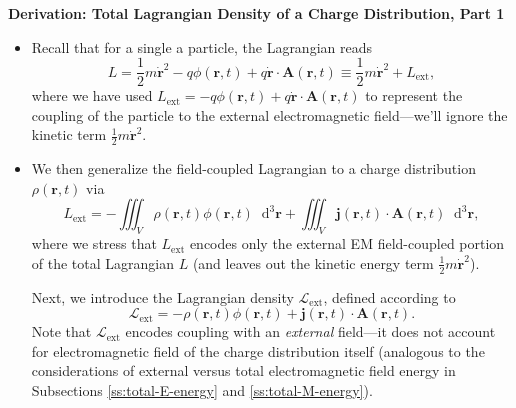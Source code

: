 \documentclass[11pt, a4paper]{article}
\newcommand{\diff}{\mathop{}\!\mathrm{d}} %
\newcommand{\dr}{\diff^{3} \r}  %
\renewcommand{\L}{\mathcal{L}}  %
\renewcommand{\vec}[1]{\bm{#1}} %
\newcommand{\bdot}[1]{\dot{\vec{#1}}}
\renewcommand{\r}{\vec{r}}
\newcommand{\A}{\vec{A}} %
\renewcommand{\j}{\vec{j}}  %
\begin{document}
\textbf{Derivation: Total Lagrangian Density of a Charge Distribution, Part 1}
\begin{itemize}
	
	\item Recall that for a single a particle, the Lagrangian reads
	\begin{equation*}
		L = \frac{1}{2}m\bdot{r}^{2} - q \phi(\r, t) + q \bdot{r}\cdot \A(\r, t) \equiv \frac{1}{2}m \dot{\vec{r}}^{2} + L_{\text{ext}},
	\end{equation*}
    where we have used $ L_{\text{ext}} = - q \phi(\r, t) + q \bdot{r}\cdot \A(\r, t) $ to represent the coupling of the particle to the external electromagnetic field---we'll ignore the kinetic term $ \frac{1}{2}m \dot{\vec{r}}^{2} $. 

    \item We then generalize the field-coupled Lagrangian to a charge distribution $ \rho(\r, t) $ via
	\begin{equation*}
		L_{\text{ext}} = - \iiint_{V}\rho(\r, t) \phi(\r, t) \dr + \iiint_{V}\j(\r, t) \cdot \A(\r, t)\dr,
	\end{equation*}
    where we stress that $ L_{\text{ext}} $ encodes only the external EM field-coupled portion of the total Lagrangian $ L $ (and leaves out the kinetic energy term $ \frac{1}{2}m \dot{\vec{r}}^{2} $).
    
    Next, we introduce the Lagrangian density $ \L_{\text{ext}} $, defined according to
	\begin{equation*}
		\L_{\text{ext}} = - \rho(\r, t) \phi(\r, t) + \j(\r, t)\cdot \A(\r, t).
	\end{equation*}
    Note that $ \L_{\text{ext}} $ encodes coupling with an \textit{external} field---it does not account for electromagnetic field of the charge distribution itself (analogous to the considerations of external versus total electromagnetic field energy in Subsections \ref{ss:total-E-energy} and \ref{ss:total-M-energy}).
	
\end{itemize}
\end{document}

